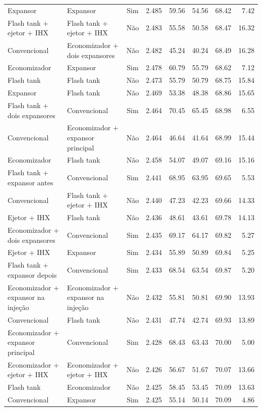 {\begin{tabular}{llcrrrrr}
Expansor & Expansor & Sim & 2.485 & 59.56 & 54.56 & 68.42 & 7.42 \\
Flash tank + ejetor + IHX & Flash tank + ejetor + IHX & Não & 2.483 & 55.58 & 50.58 & 68.47 & 16.32 \\
Convencional & Economizador + dois expansores & Não & 2.482 & 45.24 & 40.24 & 68.49 & 16.28 \\
Economizador & Expansor & Sim & 2.478 & 60.79 & 55.79 & 68.62 & 7.12 \\
Flash tank & Flash tank & Não & 2.473 & 55.79 & 50.79 & 68.75 & 15.84 \\
Expansor & Flash tank & Não & 2.469 & 53.38 & 48.38 & 68.86 & 15.65 \\
Flash tank + dois expansores & Convencional & Sim & 2.464 & 70.45 & 65.45 & 68.98 & 6.55 \\
Convencional & Economizador + expansor principal & Não & 2.464 & 46.64 & 41.64 & 68.99 & 15.44 \\
Economizador & Flash tank & Não & 2.458 & 54.07 & 49.07 & 69.16 & 15.16 \\
Flash tank + expansor antes & Convencional & Sim & 2.441 & 68.95 & 63.95 & 69.65 & 5.53 \\
Convencional & Flash tank + ejetor + IHX & Não & 2.440 & 47.23 & 42.23 & 69.66 & 14.33 \\
Ejetor + IHX & Flash tank & Não & 2.436 & 48.61 & 43.61 & 69.78 & 14.13 \\
Economizador + dois expansores & Convencional & Sim & 2.435 & 69.17 & 64.17 & 69.82 & 5.27 \\
Ejetor + IHX & Expansor & Sim & 2.434 & 55.89 & 50.89 & 69.84 & 5.25 \\
Flash tank + expansor depois & Convencional & Sim & 2.433 & 68.54 & 63.54 & 69.87 & 5.20 \\
Economizador + expansor na injeção & Economizador + expansor na injeção & Não & 2.432 & 55.81 & 50.81 & 69.90 & 13.93 \\
Convencional & Flash tank & Não & 2.431 & 47.74 & 42.74 & 69.93 & 13.89 \\
Economizador + expansor principal & Convencional & Sim & 2.428 & 68.43 & 63.43 & 70.00 & 5.00 \\
Economizador + ejetor + IHX & Economizador + ejetor + IHX & Não & 2.426 & 56.67 & 51.67 & 70.07 & 13.66 \\
Flash tank & Economizador & Não & 2.425 & 58.45 & 53.45 & 70.09 & 13.63 \\
Convencional & Expansor & Sim & 2.425 & 55.14 & 50.14 & 70.09 & 4.86 \\

\end{tabular}}
